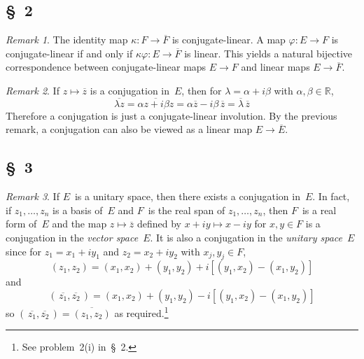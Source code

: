 \documentclass[letterpaper,12pt]{article}
\newcommand{\R}{\mathbb{R}}
\newcommand{\iprod}[2]{(#1,#2)}
\newcommand{\conj}[1]{\overline{#1}}
\theoremstyle{definition}
\theoremstyle{remark}
\newtheorem*{rmk}{Remark}
\begin{document}
\subsection*{\S~2}
\begin{rmk}
The identity map \(\kappa:F\to\conj{F}\) is conjugate-linear. A map \(\varphi:E\to F\) is conjugate-linear if and only if \(\kappa\varphi:E\to\conj{F}\) is linear. This yields a natural bijective correspondence between conjugate-linear maps \(E\to F\) and linear maps \(E\to\conj{F}\).
\end{rmk}

\begin{rmk}
If \(z\mapsto\conj{z}\) is a conjugation in~\(E\), then for \(\lambda=\alpha+i\beta\) with \(\alpha,\beta\in\R\),
\[\conj{\lambda z}=\conj{\alpha z+i\beta z}=\alpha\conj{z}-i\beta\,\conj{z}=\conj{\lambda}\,\conj{z}\]
Therefore a conjugation is just a conjugate-linear involution. By the previous remark, a conjugation can also be viewed as a linear map \(E\to\conj{E}\).
\end{rmk}

\subsection*{\S~3}
\begin{rmk}
If \(E\)~is a unitary space, then there exists a conjugation in~\(E\). In fact, if \(z_1,\ldots,z_n\) is a basis of~\(E\) and \(F\)~is the real span of \(z_1,\ldots,z_n\), then \(F\)~is a real form of~\(E\) and the map \(z\mapsto\conj{z}\) defined by \(x+iy\mapsto x-iy\) for \(x,y\in F\) is a conjugation in the \emph{vector space}~\(E\). It is also a conjugation in the \emph{unitary space}~\(E\) since for \(z_1=x_1+iy_1\) and \(z_2=x_2+iy_2\) with \(x_j,y_j\in F\),
\[\iprod{z_1}{z_2}=\iprod{x_1}{x_2}+\iprod{y_1}{y_2}+i\left[\iprod{y_1}{x_2}-\iprod{x_1}{y_2}\right]\]
and
\[\iprod{\,\conj{z_1}}{\conj{z_2}\,}=\iprod{x_1}{x_2}+\iprod{y_1}{y_2}-i\left[\iprod{y_1}{x_2}-\iprod{x_1}{y_2}\right]\]
so \(\iprod{\,\conj{z_1}}{\conj{z_2}\,}=\conj{\iprod{z_1}{z_2}}\) as required.\footnote{See problem~2(i) in~\S~2.}
\end{rmk}
\end{document}
